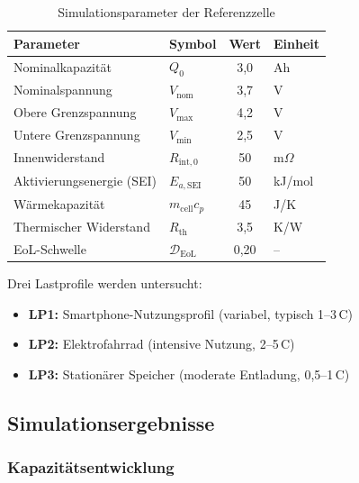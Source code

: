 ﻿\documentclass[12pt,a4paper]{article}
\begin{document}
	\begin{table}[H]
		\centering
		\caption{Simulationsparameter der Referenzzelle}
		\label{tab:params}
		\begin{tabular}{llcl}
			\toprule
			\textbf{Parameter} & \textbf{Symbol} & \textbf{Wert} & \textbf{Einheit} \\
			\midrule
			Nominalkapazität & $Q_0$ & 3{,}0 & Ah \\
			Nominalspannung & $V_\mathrm{nom}$ & 3{,}7 & V \\
			Obere Grenzspannung & $V_\mathrm{max}$ & 4{,}2 & V \\
			Untere Grenzspannung & $V_\mathrm{min}$ & 2{,}5 & V \\
			Innenwiderstand & $R_\mathrm{int,0}$ & 50 & m$\Omega$ \\
			Aktivierungsenergie (SEI) & $E_{a,\mathrm{SEI}}$ & 50 & kJ/mol \\
			Wärmekapazität & $m_\mathrm{cell}c_p$ & 45 & J/K \\
			Thermischer Widerstand & $R_\mathrm{th}$ & 3{,}5 & K/W \\
			EoL-Schwelle & $\mathcal{D}_\mathrm{EoL}$ & 0{,}20 & -- \\
			\bottomrule
		\end{tabular}
	\end{table}
	
	Drei Lastprofile werden untersucht:
	\begin{itemize}
		\item \textbf{LP1:} Smartphone-Nutzungsprofil (variabel, typisch 1--3\,C)
		\item \textbf{LP2:} Elektrofahrrad (intensive Nutzung, 2--5\,C)
		\item \textbf{LP3:} Stationärer Speicher (moderate Entladung, 0{,}5--1\,C)
	\end{itemize}
	
	\subsection{Simulationsergebnisse}
	
	\subsubsection{Kapazitätsentwicklung}
	
\end{document}
